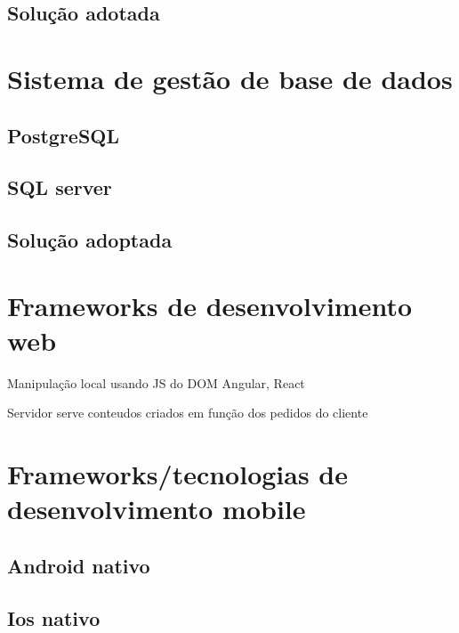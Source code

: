 \subsection{Solução adotada}







\section{Sistema de gestão de base de dados}


\subsection{PostgreSQL}


\subsection{SQL server}



\subsection{Solução adoptada}



\section{Frameworks de desenvolvimento web}


Manipulação local usando JS do DOM
Angular, React

Servidor serve conteudos criados em função dos pedidos do cliente 





\section{Frameworks/tecnologias de desenvolvimento mobile}



\subsection{Android nativo}

\subsection{Ios nativo}

